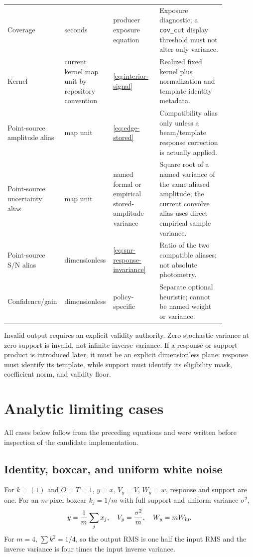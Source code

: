 \documentclass[11pt]{article}
\newcommand{\code}[1]{\nolinkurl{#1}}
\begin{document}
\begin{longtable}{L{0.19\linewidth}L{0.17\linewidth}L{0.21\linewidth}L{0.30\linewidth}}
Coverage & seconds & producer exposure equation & Exposure diagnostic; a \code{cov_cut} display threshold must not alter only variance.\\
Kernel & current kernel map unit by repository convention & \eqref{eq:interior-signal} & Realized fixed kernel plus normalization and template identity metadata.\\
Point-source amplitude alias & map unit & \eqref{eq:edge-stored} & Compatibility alias only unless a beam/template response correction is actually applied.\\
Point-source uncertainty alias & map unit & named formal or empirical stored-amplitude variance & Square root of a named variance of the same aliased amplitude; the current convolve alias uses direct empirical sample variance.\\
Point-source S/N alias & dimensionless & \eqref{eq:snr-response-invariance} & Ratio of the two compatible aliases; not absolute photometry.\\
Confidence/gain & dimensionless & policy-specific & Separate optional heuristic; cannot be named weight or variance.\\
\bottomrule
\end{longtable}

Invalid output requires an explicit validity authority.  Zero stochastic
variance at zero support is invalid, not infinite inverse variance.  If a
response or support product is introduced later, it must be an explicit
dimensionless plane: response must identify its template, while support must
identify its eligibility mask, coefficient norm, and validity floor.

\section{Analytic limiting cases}
\label{sec:cases}

All cases below follow from the preceding equations and were written before
inspection of the candidate implementation.

\subsection{Identity, boxcar, and uniform white noise}

For $k=(1)$ and $O=T=1$, $y=x$, $V_y=V$, $W_y=w$, response and support are
one.
For an $m$-pixel boxcar $k_j=1/m$ with full support and uniform variance
$\sigma^2$,
\begin{equation}
 y={1\over m}\sum_jx_j,\quad V_y={\sigma^2\over m},\quad
 W_y=mW_{\rm in}.
 \label{eq:case-boxcar}
\end{equation}
For $m=4$, $\sum k^2=1/4$, so the output RMS is one half the input RMS and the
inverse variance is four times the input inverse variance.
\end{document}
